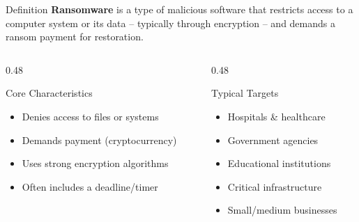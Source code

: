 \documentclass[aspectratio=169]{beamer}
\begin{document}
\begin{frame}{Definition}
  \textbf{Ransomware} is a type of malicious software that restricts access to a computer system or its data -- typically through \alert{encryption} -- and demands a \alert{ransom payment} for restoration.

  \vspace{1em}

  \begin{columns}[T]
    \begin{column}{0.48\textwidth}
      \begin{block}{Core Characteristics}
        \begin{itemize}
          \item Denies access to files or systems
          \item Demands payment (cryptocurrency)
          \item Uses strong encryption algorithms
          \item Often includes a deadline/timer
        \end{itemize}
      \end{block}
    \end{column}
    \begin{column}{0.48\textwidth}
      \begin{block}{Typical Targets}
        \begin{itemize}
          \item Hospitals \& healthcare
          \item Government agencies
          \item Educational institutions
          \item Critical infrastructure
          \item Small/medium businesses
        \end{itemize}
      \end{block}
    \end{column}
  \end{columns}
\end{frame}
\end{document}
